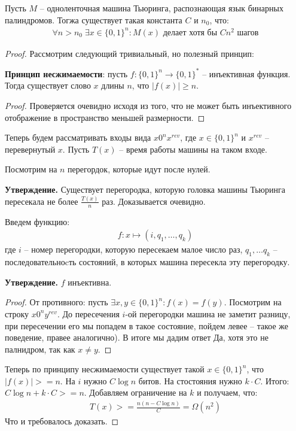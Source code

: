 \begin{theorem}
    Пусть $M$ -- одноленточная машина Тьюринга, распознающая язык бинарных палиндромов. Тогжа существует такая константа $C$ и $n_0$, что:
    \begin{gather*}
      \forall n > n_0 \; \exists x \in \{0, 1\}^n  : M(x) \text{ делает хотя бы $Cn^2$ шагов}
    \end{gather*}  
\end{theorem}
\begin{proof}
    Рассмотрим следующий тривиальный, но полезный принцип: 
    \begin{lemma}
      \textbf{Принцип несжимаемости}: пусть $f: \{0, 1\}^n \to \{0, 1\}^*$ -- инъективная функция. Тогда существует слово $x$ длины $n$, что $|f(x)| \geqslant n$.
    \end{lemma}
    \begin{proof}
      Проверяется очевидно исходя из того, что не может быть инъективного отображение в пространство меньшей размерности.
    \end{proof}

    Теперь будем рассматривать входы вида $x0^nx^{rev}$, где $x \in \{0, 1\}^n$ и $x^{rev}$ -- перевернутый $x$.
    Пусть $T(x)$ -- время работы машины на таком входе.
 
    Посмотрим на $n$ перегордок, которые идут после нулей.
 
    \textbf{Утверждение.} Существует перегородка, которую головка машины Тьюринга пересекала не более $\frac{T(x)}{n}$ раз. Доказывается очевидно.
 
    Введем функцию: 
    \begin{gather*}
      f: x \longmapsto (i, q_1, \dots, q_k)
    \end{gather*}
    где $i$ -- номер перегородки, которую пересекаем малое число раз, $q_1, \dots q_k$ -- последовательноcть состояний, в которых машина пересекла эту перегородку.
 
    \textbf{Утверждение.} $f$ инъективна. 
    \begin{proof}
      От противного: пусть $\exists x, y \in \{0, 1\}^n : f(x) = f(y)$. Посмотрим на строку $x0^ny^{rev}$. До пересечения $i$-ой перегородки машина не заметит разницу, при пересечении его мы попадем в такое состояние, пойдем левее -- такое же поведение, правее аналогично). В итоге мы дадим ответ Да, хотя это не палнидром, так как $x \neq y$.
    \end{proof} 
    Теперь по принципу несжимаемости существует такой $x \in \{0, 1\}^n$, что $|f(x)| >= n$. На $i$ нужно $C \log n$ битов. На стостояния нужно $k \cdot C$. Итого: $C\log n + k \cdot C >= n$. Добавляем ограничение на $k$ и получаем, что:
    \begin{gather*}
      T(x) >= \frac{n(n - C\log n)}{C} = \Omega(n^2)
    \end{gather*}
    Что и требовалось доказать.
\end{proof}
 
